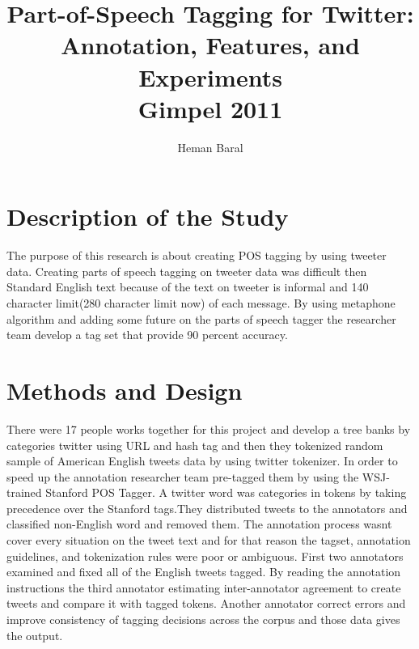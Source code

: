 \documentclass[journal, a4paper]{IEEEtran}
\begin{document}
	\title{Part-of-Speech Tagging for Twitter: Annotation,
Features, and Experiments\\Gimpel 2011}
	\author{Heman Baral}{}
	\maketitle
\section{Description of the Study} 

	The purpose of this research is about creating POS tagging by using tweeter data. Creating parts of speech tagging on tweeter data was difficult then Standard English text because of the text on tweeter is informal and 140 character limit(280 character limit now) of each message. By using metaphone algorithm and adding some future on the parts of speech tagger the researcher team develop a tag set that provide 90 percent accuracy.


\section{Methods and Design}
	There were 17 people works together for this project and develop a tree banks by categories twitter using URL and hash tag and then they tokenized random sample of American English tweets data by using twitter tokenizer. In order to speed up the annotation researcher team pre-tagged them by using the WSJ-trained Stanford POS Tagger. A twitter word was categories in tokens by taking precedence over the Stanford tags.They distributed tweets to the annotators and classified non-English word and removed them. The annotation process wasnt cover every situation on the tweet text and for that reason the tagset, annotation guidelines, and tokenization rules were poor or ambiguous. First two annotators examined and fixed all of the English tweets tagged. By reading the annotation instructions the third annotator estimating inter-annotator agreement to create tweets and compare it with tagged tokens. Another annotator correct errors and improve consistency of tagging decisions across the corpus and those data gives the output.


\end{document}
